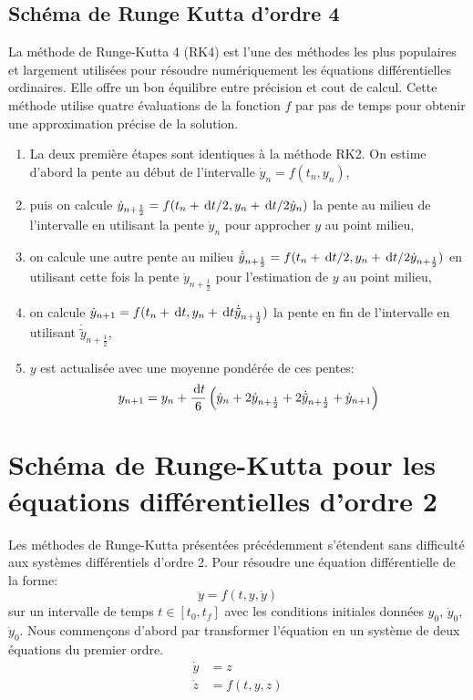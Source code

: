 \documentclass[10pt]{book}
\begin{document}
\begin{appendices}
\subsection{Schéma de Runge Kutta d'ordre 4}\label{Subsection:RK4_EDO_1}
La méthode de Runge-Kutta 4 (RK4) est l'une des méthodes les plus populaires et largement utilisées pour résoudre numériquement les équations différentielles ordinaires. Elle offre un bon équilibre entre précision et cout de calcul. Cette méthode utilise quatre évaluations  de la fonction $f$ par pas de temps pour obtenir une approximation précise de la solution.
\begin{enumerate}
\item La deux première étapes sont identiques à la méthode RK2. On estime d'abord la pente au début de l'intervalle $\dot{y}_{n} = f(t_{n},y_{n})$,
\item puis on calcule $\dot{y}_{n+\frac{1}{2}} = f(t_{n}+\,\mathrm{d}t/2,y_{n}+\,\mathrm{d}t/2\dot{y}_{n})$ la pente au milieu de l'intervalle en utilisant la pente $\dot{y}_{n}$ pour approcher $y$ au point milieu,
\item on calcule une autre pente au milieu $\dot{\tilde{y}}_{n+\frac{1}{2}} = f(t_{n}+\,\mathrm{d}t/2,y_{n}+\,\mathrm{d}t/2\dot{y}_{n+\frac{1}{2}})$ en utilisant cette fois la pente $\dot{y}_{n+\frac{1}{2}}$ pour l'estimation de $y$ au point milieu,
\item on calcule $\dot{y}_{n+1} = f(t_{n}+\,\mathrm{d}t,y_{n}+\,\mathrm{d}t\dot{\tilde{y}}_{n+\frac{1}{2}})$ la pente en fin de l'intervalle en utilisant $\dot{\tilde{y}}_{n+\frac{1}{2}}$,
\item $y$ est actualisée avec une moyenne pondérée de ces pentes:
$$y_{n+1} = y_{n}+\dfrac{\,\mathrm{d}t}{6}\left(\dot{y}_{n}+2\dot{y}_{n+\frac{1}{2}}+2\dot{\tilde{y}}_{n+\frac{1}{2}}+\dot{y}_{n+1}\right)$$
\end{enumerate}
\section{Schéma de Runge-Kutta pour les équations différentielles d'ordre 2}
Les méthodes de Runge-Kutta présentées précédemment s'étendent sans difficulté aux systèmes différentiels d'ordre 2. Pour résoudre une équation différentielle de la forme:
$$\ddot{y} = f(t,y,\dot{y})$$
sur un intervalle de temps $t\in[t_{0},t_{f}]$ avec les conditions initiales données $y_{0}$, $\dot{y}_{0}$, $\ddot{y}_{0}$. Nous commençons d'abord par transformer l'équation en un système de deux équations du premier ordre.
$$\begin{aligned}
\dot{y} &= z\\
\dot{z} &= f(t,y,z)
\end{aligned}$$

\end{appendices}
\end{document}
